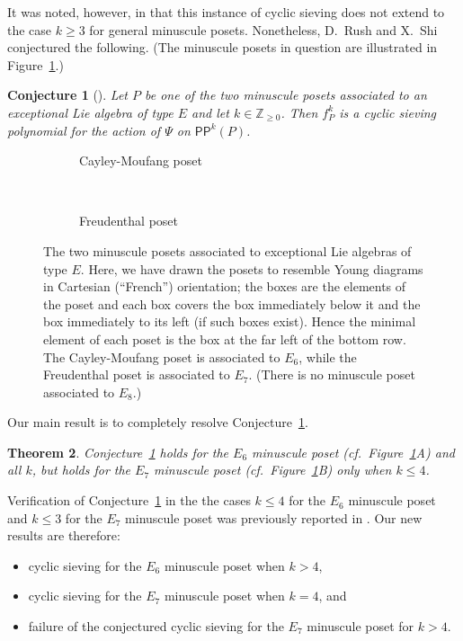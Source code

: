 \documentclass[12pt]{amsart}
\newtheorem{theorem}{Theorem}[section]
\newtheorem{conjecture}[theorem]{Conjecture}
\theoremstyle{definition}
\theoremstyle{remark}
\numberwithin{equation}{section}
\newcommand{\pp}{\ensuremath{\mathsf{PP}}}
\begin{document}
It was noted, however, in \cite{Rush.Shi} that this instance of cyclic sieving does not extend to the case $k\geq 3$ for general minuscule posets.
Nonetheless, D.~Rush and X.~Shi conjectured the following. (The minuscule posets in question are illustrated in Figure~\ref{fig:min_poset_E}.)
\begin{conjecture}[{\cite[Conjecture~11.1]{Rush.Shi}}]\label{conj:rush.shi}
Let $P$ be one of the two minuscule posets associated to an exceptional Lie algebra of type $E$ and let $k \in \mathbb{Z}_{\geq 0}$. Then $f_P^k$ is a cyclic sieving polynomial for the action of $\Psi$ on $\pp^k(P)$.
\end{conjecture}

\begin{figure}[h]
	\begin{subfigure}[b]{0.35\textwidth}
		\centering
		\caption{Cayley-Moufang poset}
	\end{subfigure} \\ \vspace{4mm}
	\begin{subfigure}[b]{0.35\textwidth}
		\centering
		\caption{Freudenthal poset}
	\end{subfigure}
\caption{The two minuscule posets associated to exceptional Lie algebras of type $E$. Here, we have drawn the posets to resemble Young diagrams in Cartesian (``French'') orientation; the boxes are the elements of the poset and each box covers the box immediately below it and the box immediately to its left (if such boxes exist). Hence the minimal element of each poset is the box at the far left of the bottom row.
 The Cayley-Moufang poset is associated to $E_6$, while the Freudenthal poset is associated to $E_7$. (There is no minuscule poset associated to $E_8$.)}
\label{fig:min_poset_E}
\end{figure}

Our main result is to completely resolve Conjecture~\ref{conj:rush.shi}. 
\begin{theorem}\label{thm:exceptionals}
Conjecture~\ref{conj:rush.shi} holds for the $E_6$ minuscule poset (cf.~Figure~\ref{fig:min_poset_E}A) and all $k$, but holds for the $E_7$ minuscule poset (cf.~Figure~\ref{fig:min_poset_E}B) only when $k \leq 4$. 
\end{theorem}  
Verification of Conjecture~\ref{conj:rush.shi} in the the cases $k \leq 4$ for the $E_6$ minuscule poset and $k \leq 3$ for the $E_7$ minuscule poset was previously reported in \cite{Rush.Shi}. Our new results are therefore:
\begin{itemize}
\item cyclic sieving for the $E_6$ minuscule poset when $k > 4$,
\item cyclic sieving for the $E_7$ minuscule poset when $k = 4$, and
\item failure of the conjectured cyclic sieving for the $E_7$ minuscule poset for $k > 4$.
\end{itemize}
\end{document}
